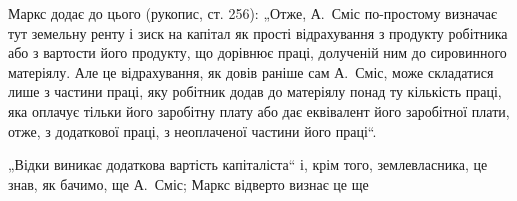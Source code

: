Маркс додає до цього (рукопис, ст. 256): „Отже, А.~Сміс по-простому
визначає тут земельну ренту і зиск на капітал як прості відрахування з
продукту робітника або з вартости його продукту, що дорівнює праці,
долученій ним до сировинного матеріялу. Але це відрахування, як довів
раніше сам А.~Сміс, може складатися лише з частини праці, яку робітник
додав до матеріялу понад ту кількість праці, яка оплачує тільки
його заробітну плату або дає еквівалент його заробітної плати, отже, з
додаткової праці, з неоплаченої частини його праці“.

„Відки виникає додаткова вартість капіталіста“ і, крім того, землевласника,
це знав, як бачимо, ще А.~Сміс; Маркс відверто визнає це ще
\parbreak{}  %
